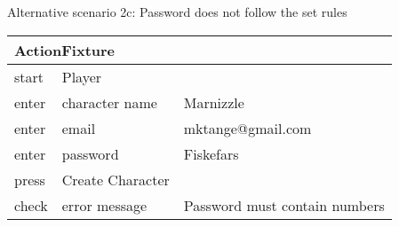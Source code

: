 \noindent Alternative scenario 2c: Password does not follow the set rules

\vspace{0.4cm}
\begin{tabular}{| p{2cm} | p{5.5cm} | p{5.5cm} |} \hline
\multicolumn{3}{|l|}{ActionFixture} \\ \hline
start & Player &  \\ \hline
enter & character name & Marnizzle \\ \hline
enter & email & mktange@gmail.com \\ \hline
enter & password & Fiskefars \\ \hline
press & Create Character &  \\ \hline
check & error message & Password must contain numbers \\ \hline
\end{tabular}
\vspace{0.8cm}
